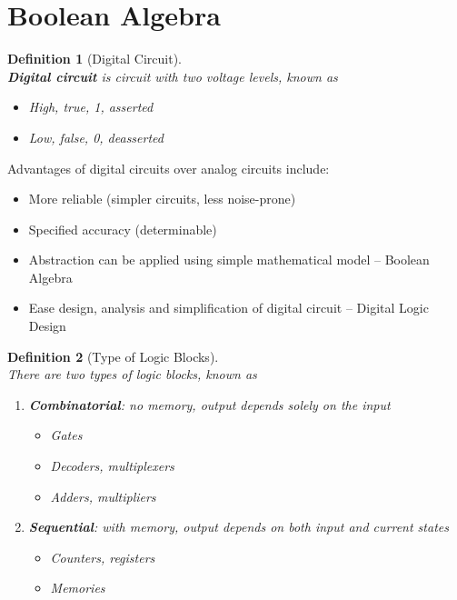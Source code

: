 \documentclass[12pt]{article}
\newtheorem{definition}{Definition}[section]
\theoremstyle{definition}
\begin{document}
\section{Boolean Algebra}
\begin{definition}[Digital Circuit]
\hfill\\\normalfont \textbf{Digital circuit} is circuit with two voltage levels, known as
\begin{itemize}
  \item High, true, 1, asserted
  \item Low, false, 0, deasserted
\end{itemize}
\end{definition}
Advantages of digital circuits over analog circuits include:
\begin{itemize}
  \item More reliable (simpler circuits, less noise-prone)
  \item Specified accuracy (determinable)
  \item Abstraction can be applied using simple mathematical model -- Boolean Algebra
  \item Ease design, analysis and simplification of digital circuit -- Digital Logic Design
\end{itemize}
\begin{definition}[Type of Logic Blocks]
\hfill\\\normalfont There are two types of logic blocks, known as
\begin{enumerate}
  \item \textbf{Combinatorial}: \textit{no} memory, output depends \textit{solely} on the input
  \begin{itemize}
    \item Gates
    \item Decoders, multiplexers
    \item Adders, multipliers
  \end{itemize}
  \item \textbf{Sequential}: \textit{with} memory, output depends on \textit{both} input and \textit{current states}
  \begin{itemize}
    \item Counters, registers
    \item Memories
  \end{itemize}
\end{enumerate}
\end{definition}
\end{document}
